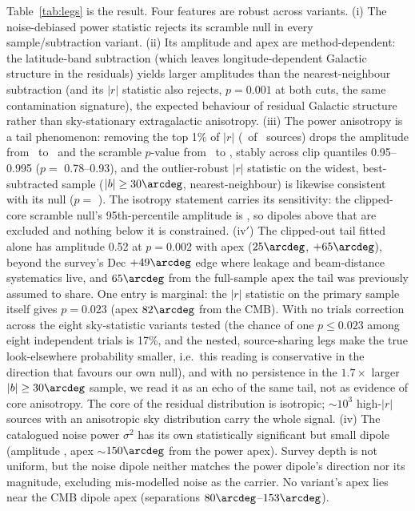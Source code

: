 \documentclass[twocolumn]{aastex631}
\begin{document}
Table~\ref{tab:legs} is the result. Four features are robust across variants. (i) The
noise-debiased power statistic rejects its scramble null in every sample/subtraction
variant. (ii) Its amplitude and apex are method-dependent: the latitude-band subtraction
(which leaves longitude-dependent Galactic structure in the residuals) yields larger
amplitudes than the nearest-neighbour subtraction (and its $|r|$ statistic also rejects,
$p=0.001$ at both cuts, the same contamination signature), the expected behaviour of residual
Galactic structure rather than sky-stationary extragalactic anisotropy. (iii) The power anisotropy
is a tail phenomenon: removing the top 1\% of $|r|$ (\rmdRealClipN\ of \rmdRealN\
sources) drops the amplitude from \rmdRealAmp\ to \rmdRealClipAmp\ and the scramble $p$-value
from \rmdRealPScramble\ to \rmdRealClipP, stably across clip quantiles 0.95--0.995
($p=$ 0.78--0.93), and the outlier-robust $|r|$ statistic on the widest, best-subtracted sample
($|b|\ge30\arcdeg$, nearest-neighbour) is likewise consistent with its null
($p=$ \rmdRealWideAbsP). The isotropy statement carries its sensitivity: the clipped-core
scramble null's 95th-percentile amplitude is \rmdRealClipNullNinetyFive, so dipoles above that are
excluded and nothing below it is constrained. (iv$'$) The clipped-out tail fitted alone has
amplitude 0.52 at $p=0.002$ with apex ($25\arcdeg$, $+65\arcdeg$), beyond the survey's
Dec $+49\arcdeg$ edge where leakage and beam-distance systematics live, and $65\arcdeg$ from
the full-sample apex the tail was previously assumed to share. One entry is marginal: the
$|r|$ statistic on the primary sample itself gives $p=0.023$ (apex $82\arcdeg$ from the CMB).
With no trials correction across the eight sky-statistic variants tested (the chance of one
$p\le0.023$ among eight independent trials is 17\%, and the nested, source-sharing legs make
the true look-elsewhere probability smaller, i.e.\ this reading is conservative in the
direction that favours our own null), and with no persistence in the $1.7\times$ larger
$|b|\ge30\arcdeg$ sample, we read it as an echo of the same tail, not as evidence of core
anisotropy. The core of the residual distribution is isotropic;
$\sim$$10^3$ high-$|r|$ sources with an anisotropic sky distribution carry the whole signal.
(iv) The catalogued noise power $\sigma^2$ has its own statistically significant but small
dipole (amplitude \rmdRealNoiseAmp, apex $\sim$$150\arcdeg$ from the power apex). Survey depth
is not uniform, but the noise dipole neither matches the power dipole's direction nor its
magnitude, excluding mis-modelled noise as the carrier. No variant's apex lies near the CMB
dipole apex (separations $80\arcdeg$--$153\arcdeg$).
\end{document}
